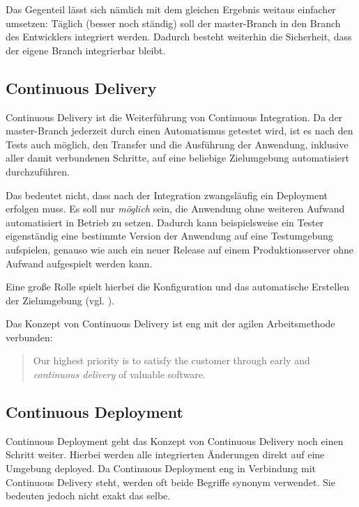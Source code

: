 Das Gegenteil lässt sich nämlich mit dem gleichen Ergebnis weitaus einfacher umsetzen: Täglich (besser noch ständig) soll der master-Branch in den Branch des Entwicklers integriert werden. Dadurch besteht weiterhin die Sicherheit, dass der eigene Branch integrierbar bleibt.

\subsection{Continuous Delivery}

Continuous Delivery ist die Weiterführung von Continuous Integration. Da der master-Branch jederzeit durch einen Automatismus getestet wird, ist es nach den Tests auch möglich, den Transfer und die Ausführung der Anwendung, inklusive aller damit verbundenen Schritte, auf eine beliebige Zielumgebung automatisiert durchzuführen.

Das bedeutet nicht, dass nach der Integration zwangsläufig ein Deployment erfolgen muss. Es soll nur \emph{möglich} sein, die Anwendung ohne weiteren Aufwand automatisiert in Betrieb zu setzen. Dadurch kann beispielsweise ein Tester eigenständig eine bestimmte Version der Anwendung auf eine Testumgebung aufspielen, genauso wie auch ein neuer Release auf einem Produktionsserver ohne Aufwand aufgespielt werden kann. \citep{FowlerCD}

Eine große Rolle spielt hierbei die Konfiguration und das automatische Erstellen der Zielumgebung (vgl. ).

Das Konzept von Continuous Delivery ist eng mit der agilen Arbeitsmethode \citep{AgileManifesto} verbunden:

\begin{quote}
  Our highest priority is to satisfy the customer through early and \emph{continuous delivery} of valuable software.
\end{quote}

\subsection{Continuous Deployment}

Continuous Deployment geht das Konzept von Continuous Delivery noch einen Schritt weiter. Hierbei werden alle integrierten Änderungen direkt auf eine Umgebung deployed. Da Continuous Deployment eng in Verbindung mit Continuous Delivery steht, werden oft beide Begriffe synonym verwendet. Sie bedeuten jedoch nicht exakt das selbe. \citep{FowlerCD}

